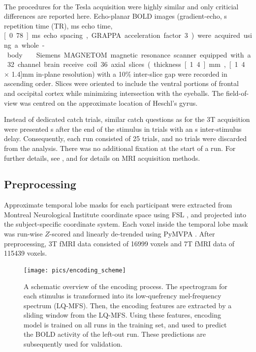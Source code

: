 \paragraph{\sevenT}
%
The procedures for the \unit[7]{Tesla} acquisition were highly similar and only
criticial differences are reported here. Echo-planar BOLD images
(gradient-echo, \unit[2]{s} repetition time (TR), \unit[22]{ms} echo time,
\unit[0.78]{ms} echo spacing, GRAPPA acceleration factor 3) were acquired using
a whole-body \sevenT\ Siemens MAGNETOM magnetic resonance scanner equipped with
a 32 channel brain receive coil. 36 axial slices (thickness \unit[1.4]{mm},
\unit[1.4 $\times$ 1.4]{mm} in-plane resolution) with a 10\% inter-slice gap
were recorded in ascending order.  Slices were oriented to include the ventral
portions of frontal and occipital cortex while minimizing intersection with the
eyeballs. The field-of-view was centred on the approximate location of Heschl's
gyrus.

Instead of dedicated catch trials, similar catch questions as for the 3T
acquisition were presented \unit[4]{s} after the end of the stimulus in trials
with an \unit[8]{s} inter-stimulus delay. Consequently, each run consisted of
25 trials, and no trials were discarded from the analysis.  There was no
additional fixation at the start of a run. For further details, see
\citet{HDH+2015}, and \citet{HBI+14} for details on MRI acquisition methods.


\subsection*{Preprocessing}

Approximate temporal lobe masks for each participant were extracted from
Montreal Neurological Institute coordinate space using FSL
\citep{SJB+04,JBB+12}, and projected into the subject-specific coordinate
system. 
Each voxel inside the temporal lobe mask was run-wise $Z$-scored and
linearly de-trended using PyMVPA \citep{HHS09b}. 
After preprocessing, 3T f{MRI} data consisted of 16999 voxels and 7T f{MRI} data of
115439 voxels.

\begin{figure}
  \centering
  \texttt{[image: pics/encoding\_scheme]}

  \caption{A schematic overview of the encoding process. The spectrogram for
    each stimulus is transformed into its low-quefrency mel-frequency spectrum
    (LQ-MFS). Then, the encoding features are extracted by a sliding window
    from the LQ-MFS. Using these features, encoding model is trained on all
    runs in the training set, and used to predict the BOLD activity of the
  left-out run.  These predictions are subsequently used for validation.}

 \label{fig:encoding_scheme}
\end{figure}

